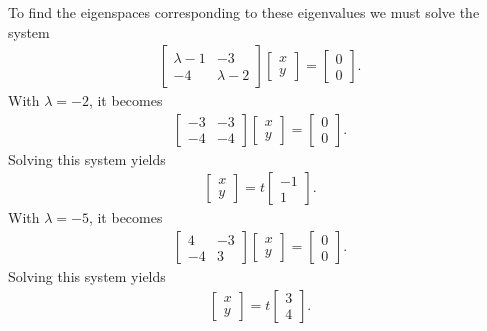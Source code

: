 \documentclass{article}
\begin{document}
\begin{enumerate}
To find the eigenspaces corresponding to these eigenvalues we must solve the system
	\begin{align*}
	\left[\begin{array}{ll} \lambda-1&-3 \\ -4&\lambda-2\end{array}\right]\left[\begin{array}{l} x\\y \end{array}\right]=\left[\begin{array}{l}0\\0\end{array}\right]	.
	\end{align*}
With $\lambda=-2$, it becomes
	\begin{align*}
	\left[\begin{array}{ll} -3&-3 \\ -4&-4\end{array}\right]\left[\begin{array}{l} x\\y \end{array}\right]=\left[\begin{array}{l}0\\0\end{array}\right]	.	
	\end{align*}
Solving this system yields 
	\begin{align*}
	\left[\begin{array}{l} x\\y \end{array}\right]=t\left[\begin{array}{l} -1\\1 \end{array}\right].
	\end{align*}
With $\lambda=-5$, it becomes
	\begin{align*}
	\left[\begin{array}{ll} 4&-3 \\ -4&3\end{array}\right]\left[\begin{array}{l} x\\y \end{array}\right]=\left[\begin{array}{l}0\\0\end{array}\right]	.	
	\end{align*}
Solving this system yields 
	\begin{align*}
	\left[\begin{array}{l} x\\y \end{array}\right]=t\left[\begin{array}{l} 3\\4 \end{array}\right].
	\end{align*}



\end{enumerate}
\end{document}
